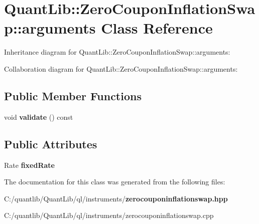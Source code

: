 \section{Quant\+Lib\+:\+:Zero\+Coupon\+Inflation\+Swap\+:\+:arguments Class Reference}
\label{class_quant_lib_1_1_zero_coupon_inflation_swap_1_1arguments}


Inheritance diagram for Quant\+Lib\+:\+:Zero\+Coupon\+Inflation\+Swap\+:\+:arguments\+:


Collaboration diagram for Quant\+Lib\+:\+:Zero\+Coupon\+Inflation\+Swap\+:\+:arguments\+:
\subsection*{Public Member Functions}
\begin{DoxyCompactItemize}
\item 
void {\bfseries validate} () const \label{class_quant_lib_1_1_zero_coupon_inflation_swap_1_1arguments_a10edaf61dca4dc0e9a7e64dbc1246400}

\end{DoxyCompactItemize}
\subsection*{Public Attributes}
\begin{DoxyCompactItemize}
\item 
Rate {\bfseries fixed\+Rate}\label{class_quant_lib_1_1_zero_coupon_inflation_swap_1_1arguments_a19b0ad7cc7f06687650d05b84e21bcbf}

\end{DoxyCompactItemize}


The documentation for this class was generated from the following files\+:\begin{DoxyCompactItemize}
\item 
C\+:/quantlib/\+Quant\+Lib/ql/instruments/{\bf zerocouponinflationswap.\+hpp}\item 
C\+:/quantlib/\+Quant\+Lib/ql/instruments/zerocouponinflationswap.\+cpp\end{DoxyCompactItemize}
